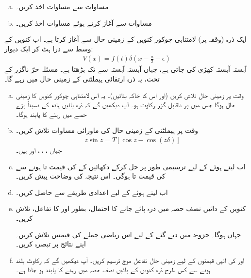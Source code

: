\begin{enumerate}[a.]
\item
مساوات  سے مساوات  اخذ کریں۔
\item
مساوات  سے آغاز کرتے ہوئے مساوات  اخذ کریں۔
\end{enumerate}


ایک ذرہ (وقفہ  پر) لامتناہی چوکور کنویں کے زمینی حال سے آغاز کرتا ہے۔ اب کنویں کے وسط سے ذرا ہٹ کر ایک دیوار:
\begin{align*}
V (x) = f (t) \delta (x - \frac{a}{2} - \epsilon)
\end{align*}
 آہستہ آہستہ کھڑی کی جاتی ہے، جہاں  آہستہ آہستہ سے  تک بڑھتا ہے۔ مسئلہ حرّ ناگزر کے تحت، یہ ذرہ ارتقائی ہیملٹنی کے زمینی حال میں رہے گا۔ 
\begin{enumerate}[a.]
\item
وقت  پر زمینی حال تلاش کریں (اور اس کا خاکہ بنائیں)۔  یہ اس لامتناہی چوکور کنویں کا زمینی حال ہوگا جس میں  پر ناقابل گزر رکاوٹ ہو۔ آپ دیکھیں گے کہ ذرہ بائیں ہاتھ کے نسبتاً بڑے حصے میں رہنے کا پابند ہوگا۔ 
\item
وقت  پر ہیملٹنی کے زمینی حال کی ماورائی مساوات تلاش کریں۔  
\begin{align*}
z \sin z = T [\cos z - \cos (z \delta)]
\end{align*}
جہاں ، ، ، اور  ہیں۔ 
\item
اب  لیتے ہوئے  کے لیے ترسیمی طور پر حل کرکے دکھائیں کے  کی قیمت  تا  ہونے سے  کی قیمت  تا  ہوگی۔ اس نتیجہ کی وضاحت پیش کریں۔
\item 
اب  لیتے ہوئے  کے لیے اعدادی طریقے سے  حاصل کریں۔ 
\item
کنویں کے دائیں نصف حصہ میں ذرہ پائے جانے کا احتمال، بطور  اور  کا تفاعل، تلاش کریں۔ 

جہاں  ہوگا۔ جزو-د میں دیے گئے  کے لیے اس ریاضی جملے کی قیمتیں تلاش کریں۔ اپنے نتائج پر تبصرہ کریں۔ 
\item
{} اور  کی انہی قیمتوں کے لیے زمینی حال تفاعل موج ترسیم کریں۔ آپ دیکھیں گے کہ رکاوٹ بلند ہونے سے کس طرح ذرہ کنویں کے بائیں نصف حصہ میں رہنے کا پابند ہو جاتا ہے۔ 
\end{enumerate}
